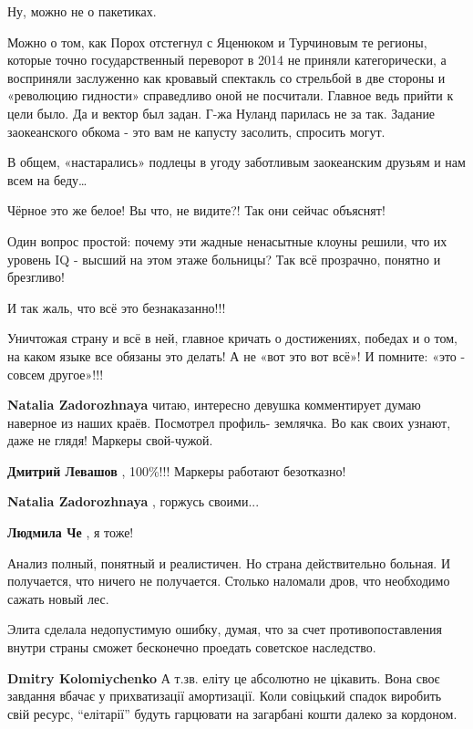 \begin{itemize}
\begin{itemize}
Ну, можно не о пакетиках.

Можно о том, как Порох отстегнул с Яценюком и Турчиновым те регионы, которые
точно государственный переворот в 2014 не приняли категорически, а восприняли
заслуженно как кровавый спектакль со стрельбой в две стороны и «революцию
гидности» справедливо оной не посчитали. Главное ведь прийти к цели было. Да и
вектор был задан. Г-жа Нуланд парилась не за так. Задание заокеанского обкома -
это вам не капусту засолить, спросить могут.

В общем, «настарались» подлецы в угоду заботливым заокеанским друзьям и нам
всем на беду…

Чёрное это же белое! Вы что, не видите?! Так они сейчас объяснят!

Один вопрос простой: почему эти жадные ненасытные клоуны решили, что их уровень
IQ - высший на этом этаже больницы? Так всё прозрачно, понятно и брезгливо!

И так жаль, что всё это безнаказанно!!!

Уничтожая страну и всё в ней, главное кричать о достижениях, победах и о том,
на каком языке все обязаны это делать! А не «вот это вот всё»! И помните: «это
- совсем другое»!!!


\textbf{Natalia Zadorozhnaya} читаю, интересно девушка комментирует думаю наверное из наших краёв. Посмотрел профиль- землячка. Во как своих узнают, даже не глядя! Маркеры свой-чужой.

\textbf{Дмитрий Левашов} , 100\%!!!
Маркеры работают безотказно!

\textbf{Natalia Zadorozhnaya} , горжусь своими...

\textbf{Людмила Че} , я тоже!
\end{itemize} %


Анализ полный, понятный и реалистичен. Но страна действительно больная. И
получается, что ничего не получается. Столько наломали дров, что необходимо
сажать новый лес.

\begin{itemize} %

Элита сделала недопустимую ошибку, думая, что за счет противопоставления внутри
страны сможет бесконечно проедать советское наследство.

\textbf{Dmitry Kolomiychenko} А т.зв. еліту це абсолютно не цікавить. Вона своє завдання вбачає у прихватизації амортизації. Коли совіцький спадок виробить свій ресурс, \enquote{елітарії} будуть гарцювати на загарбані кошти далеко за кордоном.
\end{itemize} %


\end{itemize}
